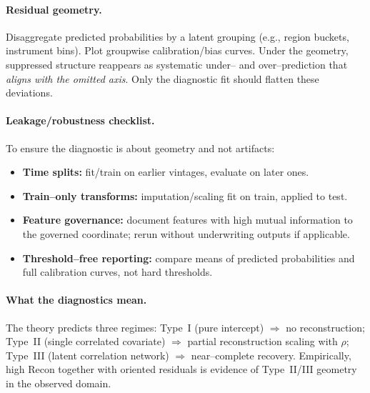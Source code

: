 \documentclass[11pt]{article}
\begin{document}
\paragraph{Residual geometry.}
Disaggregate predicted probabilities by a latent grouping (e.g., region buckets, instrument bins). Plot groupwise calibration/bias curves. Under the geometry, suppressed structure reappears as systematic under– and over–prediction that \emph{aligns with the omitted axis}. Only the diagnostic fit should flatten these deviations.

\paragraph{Leakage/robustness checklist.}
To ensure the diagnostic is about geometry and not artifacts:
\begin{itemize}[leftmargin=1.2em]
  \item \textbf{Time splits:} fit/train on earlier vintages, evaluate on later ones.
  \item \textbf{Train–only transforms:} imputation/scaling fit on train, applied to test.
  \item \textbf{Feature governance:} document features with high mutual information to the governed coordinate; rerun without underwriting outputs if applicable.
  \item \textbf{Threshold–free reporting:} compare means of predicted probabilities and full calibration curves, not hard thresholds.
\end{itemize}

\paragraph{What the diagnostics mean.}
The theory predicts three regimes:
Type~I (pure intercept) $\Rightarrow$ no reconstruction;
Type~II (single correlated covariate) $\Rightarrow$ partial reconstruction scaling with $\rho$;
Type~III (latent correlation network) $\Rightarrow$ near–complete recovery.
Empirically, high $\mathrm{Recon}$ together with oriented residuals is evidence of Type~II/III geometry in the observed domain.
\end{document}
